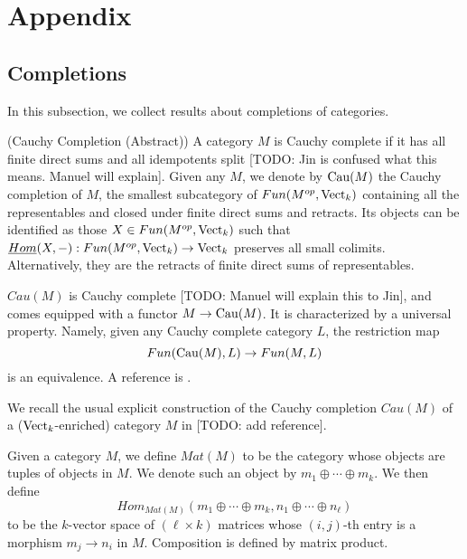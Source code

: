
    
    
    
    
    
    
    
    
    
    
    
    
    
    
    
    
\appendix
\section{Appendix}
   
\subsection{Completions}

\noindent In this subsection, we collect results about completions of categories.

\begin{definition} (Cauchy Completion (Abstract))
  A category $M$ is Cauchy complete if it has all finite direct sums and all
  idempotents split [TODO: Jin is confused what this means. Manuel will explain]. Given any $M$, we denote by $\operatorname{Cau}(M)$ the Cauchy
  completion of $M$, the smallest subcategory of $Fun(M^{op},\operatorname{Vect}_k)$
  containing all the representables and closed under finite direct sums and
  retracts. Its objects can be identified as those $X\in Fun(M^{op},\operatorname{Vect}_k)$
  such that $\underline{Hom}(X,-):Fun(M^{op},\operatorname{Vect}_k)\to\operatorname{Vect}_k$ preserves all
  small colimits. Alternatively, they are the retracts of finite direct sums
  of representables.

  $Cau(M)$ is Cauchy complete [TODO: Manuel will explain this to Jin], and comes equipped with a functor
  $M\to \operatorname{Cau}(M)$. It is characterized by a universal property. Namely, given
  any Cauchy complete category $L$, the restriction
  map $$Fun(\operatorname{Cau}(M),L)\to Fun(M,L)$$ is an equivalence. A reference is
  \cite[Sections 5.5 and 5.7]{kelly/basic-concepts-enriched}.
\end{definition}

\noindent We recall the usual explicit construction of the Cauchy completion $Cau(M)$ of a ($\operatorname{Vect}_k$-enriched) category $M$ in [TODO: add reference].

\begin{definition}

Given a category $M$, we define $Mat(M)$ to be the category whose objects are tuples of objects in $M$. We denote such an object by $m_1\oplus\cdots\oplus m_k$. We then define $$Hom_{Mat(M)}(m_1\oplus\cdots\oplus m_k,n_1\oplus\cdots\oplus n_{\ell})$$ to be the $k$-vector space of $(\ell\times k)$ matrices whose $(i,j)$-th entry is a morphism $m_j\to n_i$ in $M$. Composition is defined by matrix product. \end{definition}

